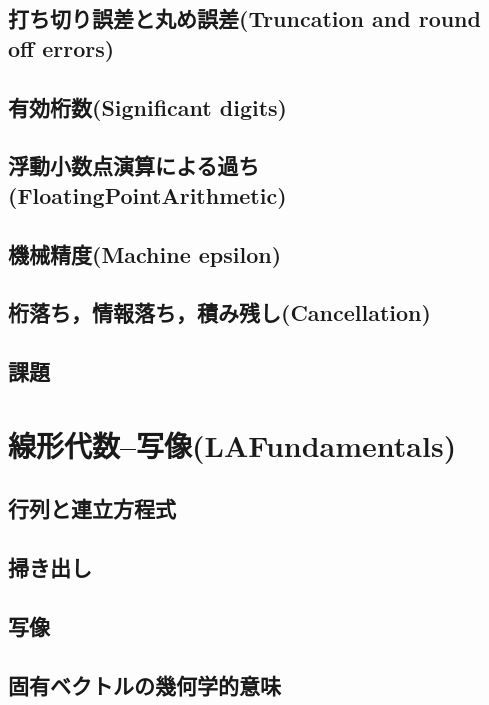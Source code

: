 \documentclass[10pt,a4j]{jsbook}
\begin{document}
\section{打ち切り誤差と丸め誤差(Truncation and round off errors)}
 
\section{有効桁数(Significant digits)}
 
\section{浮動小数点演算による過ち(FloatingPointArithmetic)}
 
\section{機械精度(Machine epsilon)}
 
\section{桁落ち，情報落ち，積み残し(Cancellation)}
 
\section{課題}
 



\chapter{線形代数--写像(LAFundamentals)}
\section{行列と連立方程式}
 
\section{掃き出し}
 
\section{写像}
 
\section{固有ベクトルの幾何学的意味}
 
\end{document}
